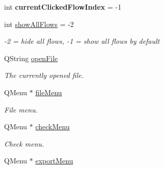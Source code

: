 \begin{DoxyCompactItemize}
\item 
\hypertarget{class_main_window_a651ff42acb84f96089f4a91aff00771a}{}int {\bfseries current\+Clicked\+Flow\+Index} = -\/1\label{class_main_window_a651ff42acb84f96089f4a91aff00771a}

\item 
\hypertarget{class_main_window_a716410ca805f3fd24ee3d00e5998dd51}{}int \hyperlink{class_main_window_a716410ca805f3fd24ee3d00e5998dd51}{show\+All\+Flows} = -\/2\label{class_main_window_a716410ca805f3fd24ee3d00e5998dd51}

\begin{DoxyCompactList}\small\item\em -\/2 = hide all flows, -\/1 = show all flows by default \end{DoxyCompactList}\item 
\hypertarget{class_main_window_a090ea7bbf9ff3fa21ba13e32f8c2d15d}{}Q\+String \hyperlink{class_main_window_a090ea7bbf9ff3fa21ba13e32f8c2d15d}{open\+File}\label{class_main_window_a090ea7bbf9ff3fa21ba13e32f8c2d15d}

\begin{DoxyCompactList}\small\item\em The currently opened file. \end{DoxyCompactList}\item 
\hypertarget{class_main_window_a426da48f6e2f865b07a28533c07c4f7a}{}Q\+Menu $\ast$ \hyperlink{class_main_window_a426da48f6e2f865b07a28533c07c4f7a}{file\+Menu}\label{class_main_window_a426da48f6e2f865b07a28533c07c4f7a}

\begin{DoxyCompactList}\small\item\em File menu. \end{DoxyCompactList}\item 
\hypertarget{class_main_window_a976ec486a97951607dd8acf14bbbe0a8}{}Q\+Menu $\ast$ \hyperlink{class_main_window_a976ec486a97951607dd8acf14bbbe0a8}{check\+Menu}\label{class_main_window_a976ec486a97951607dd8acf14bbbe0a8}

\begin{DoxyCompactList}\small\item\em Check menu. \end{DoxyCompactList}\item 
\hypertarget{class_main_window_a04c3da2faf42d4d70c0e4e5447b612c6}{}Q\+Menu $\ast$ \hyperlink{class_main_window_a04c3da2faf42d4d70c0e4e5447b612c6}{export\+Menu}\label{class_main_window_a04c3da2faf42d4d70c0e4e5447b612c6}


\end{DoxyCompactItemize}
